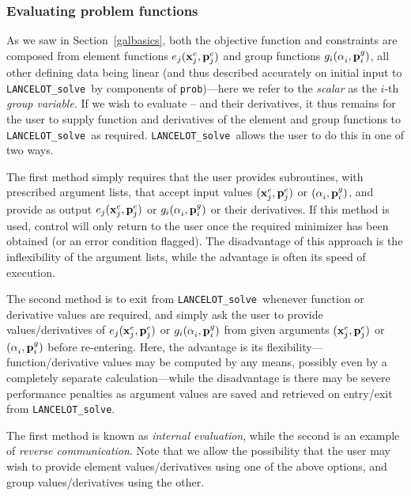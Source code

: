 \documentclass{galahad}
\newcommand{\fullpackagename}{LANC\-E\-LOT}
\newcommand{\solver}{{\tt \fullpackagename\_solve}}
\newcommand{\calE}{{\cal E}}
\begin{document}

\subsubsection{Evaluating problem functions\label{pfe}}

As we saw in Section~\ref{galbasics},
both the objective function  and constraints 
are composed from element functions $e_j({\mathbf{x}}^e_j, {\mathbf{p}}^e_j)$ and
group functions $g_i( \alpha^{ }_i, {\mathbf{p}}^g_i )$, all other defining data
being linear (and thus described accurately on initial input
to \solver\ by components of {\tt prob})---here we refer to the {\em scalar}
\disp{\alpha_i \eqdef \sum_{j \in \calE_i} w^e_{ij} e_j(\bmx^e_j, \bmp^e_j)
  + \bma_i^T \bmx - b_i.}
as the $i$-th {\em group variable}. If we wish to evaluate
-- and their derivatives,
it thus remains for the user to supply function and derivatives
of the element and group functions to \solver\ as required.
\solver\ allows the user to do this in one of two ways.

The first method simply requires that the user provides
subroutines, with prescribed argument lists, that accept input
values $({\mathbf{x}}^e_j, {\mathbf{p}}^e_j)$ or $(\alpha^{ }_i, {\mathbf{p}}^g_i)$, and provide
as output
$e_j({\mathbf{x}}^e_j, {\mathbf{p}}^e_j)$ or $g_i(\alpha^{ }_i, {\mathbf{p}}^g_i)$
or their derivatives. If this method is used, control will only return
to the user once the required minimizer has been obtained (or an error
condition flagged). The disadvantage of this approach is the inflexibility
of the argument lists, while the advantage is often its speed of execution.

The second method is to exit from \solver\ whenever function or derivative
values are required, and simply ask the user to provide
values/derivatives of
$e_j({\mathbf{x}}^e_j, {\mathbf{p}}^e_j)$ or $g_i(\alpha^{ }_i, {\mathbf{p}}^g_i)$
from given arguments
$({\mathbf{x}}^e_j, {\mathbf{p}}^e_j)$ or $(\alpha^{ }_i, {\mathbf{p}}^g_i)$ before re-entering.
Here, the advantage is
its flexibility---function/derivative values may be computed by any means,
possibly even by a completely separate calculation---while the
disadvantage is there may be severe performance penalties as
argument values are saved and retrieved on entry/exit from \solver.

The first method is known as {\em internal evaluation}, while the
second is an example of {\em reverse communication}.
Note that we allow the possibility that the user may wish to provide
element values/derivatives using one of the above options,
and group values/derivatives using the other.
\end{document}
